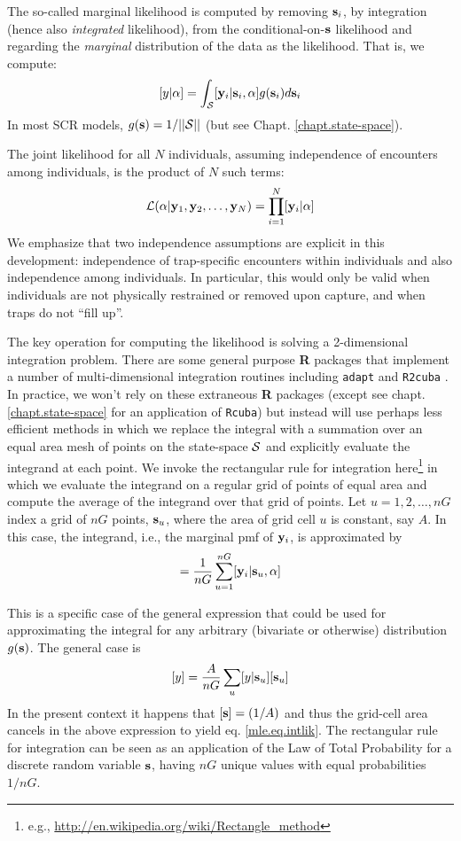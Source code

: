  The so-called marginal likelihood is computed by removing
${\bf s}_{i}$, by integration (hence also {\it integrated} likelihood), from the conditional-on-${\bf s}$
likelihood and regarding the {\it marginal} distribution of the data
as 
the likelihood. That
is, we compute:
\[
  [y|\alpha] = 
\int_{{\cal S}}  [ {\bf y}_{i} |{\bf s}_{i}, \alpha] g({\bf s}_{i}) d{\bf s}_{i}
\]
In most SCR models, $g({\bf s}) = 1/||{\cal S}||$ (but see Chapt. \ref{chapt.state-space}).

The joint likelihood for all $N$ individuals, assuming independence of
encounters among individuals, is the product of $N$ such terms:
\[
{\cal L}(\alpha | {\bf y}_{1},{\bf y}_{2},\ldots, {\bf y}_{N}) =     \prod_{i=1}^{N}
[{\bf y}_{i}|\alpha]
\]
We emphasize that two independence assumptions are explicit in this
development: independence of trap-specific encounters within
individuals and also independence among individuals. In particular,
this would only be valid when individuals are not physically
restrained or removed upon capture, and when traps do not ``fill up''.

The key operation for computing the likelihood is solving a
2-dimensional integration problem. There are some general purpose {\bf
  R} packages that implement a number of 
 multi-dimensional integration routines
including \mbox{\tt adapt} \citep{genz_etal:2007} and \mbox{\tt R2cuba}
\citep{hahn_etal:2011}.  In practice, we won't rely
on these extraneous {\bf R} packages (except see
chapt. \ref{chapt.state-space} for an application of \mbox{\tt Rcuba})
but instead will use perhaps less
efficient methods in which we replace the integral with a summation
over an equal area mesh of points on the state-space ${\cal S}$ and explicitly
evaluate the integrand at each point. We invoke the rectangular rule
for integration here\footnote{e.g., 
\url{http://en.wikipedia.org/wiki/Rectangle_method}
} in which we
evaluate the
integrand on a regular grid of points of equal area and compute the
average of
the integrand over that grid of points. 
Let $u=1,2,\ldots,nG$ index a grid of
$nG$ points, ${\bf s}_{u}$,  where the area of grid cell $u$ is
constant, say $A$.
In this case, the integrand, i.e., the marginal pmf of 
${\bf y}_{i}$, is approximated by  
\begin{equation}
         [{\bf y}_{i}|\alpha] = \frac{1}{nG} \sum_{u=1}^{nG}  [ {\bf
            y}_{i} |{\bf s}_u, \alpha]
\label{mle.eq.intlik}
\end{equation}

This is a specific case of the general expression that could be used
for approximating the integral for any arbitrary (bivariate or otherwise)
distribution $g({\bf s})$. The general case is
\[
[y]  = \frac{A}{nG} \sum_{u} [y|{\bf s}_{u}] [{\bf s}_{u}]
\]
 In the present context it happens that  $[{\bf s}] = (1/A)$
and thus the grid-cell area cancels in the above
expression to yield eq. \ref{mle.eq.intlik}.
The rectangular rule for integration can be seen as an application of
the Law of Total Probability for a discrete random variable ${\bf
  s}$, having $nG$ 
unique values with equal probabilities $1/nG$.



